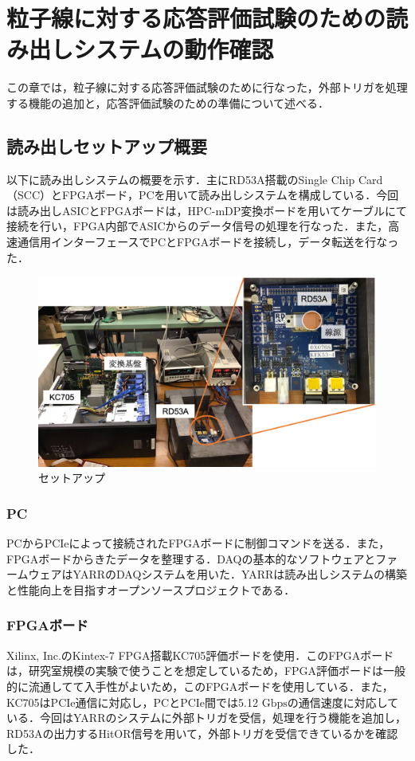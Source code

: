\chapter{粒子線に対する応答評価試験のための読み出しシステムの動作確認}
この章では，粒子線に対する応答評価試験のために行なった，外部トリガを処理する機能の追加と，応答評価試験のための準備について述べる．

\section{読み出しセットアップ概要}
以下に読み出しシステムの概要を示す．主にRD53A搭載のSingle Chip Card（SCC）とFPGAボード，PCを用いて読み出しシステムを構成している．今回は読み出しASICとFPGAボードは，HPC-mDP変換ボードを用いてケーブルにて接続を行い，FPGA内部でASICからのデータ信号の処理を行なった．また，高速通信用インターフェースでPCとFPGAボードを接続し，データ転送を行なった．\par

\begin{figure}[h]
  \centering
  \includegraphics[width=15cm]{./figure/Setup.png}
  \caption{セットアップ}
  \label{fig:setup}
\end{figure}

\subsection*{PC}
PCからPCIeによって接続されたFPGAボードに制御コマンドを送る．また，FPGAボードからきたデータを整理する．DAQの基本的なソフトウェアとファームウェアはYARRのDAQシステムを用いた．YARRは読み出しシステムの構築と性能向上を目指すオープンソースプロジェクトである．

\subsection*{FPGAボード}
Xilinx, Inc.のKintex-7 FPGA搭載KC705評価ボードを使用．このFPGAボードは，研究室規模の実験で使うことを想定しているため，FPGA評価ボードは一般的に流通してて入手性がよいため，このFPGAボードを使用している．また，KC705はPCIe通信に対応し，PCとPCIe間では5.12 $\mathrm{Gbps}$の通信速度に対応している．今回はYARRのシステムに外部トリガを受信，処理を行う機能を追加し，RD53Aの出力するHitOR信号を用いて，外部トリガを受信できているかを確認した．

